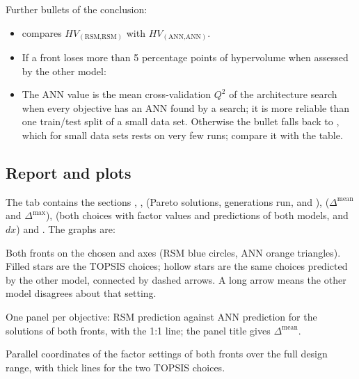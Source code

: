 Further bullets of the conclusion:
\begin{itemize}
  \item {}
        compares $HV_{(\text{RSM,RSM})}$ with $HV_{(\text{ANN,ANN})}$.
  \item If a front loses more than 5 percentage points of hypervolume when assessed by the other model:
  \item {} The ANN value is the mean
        cross-validation $Q^2$ of the architecture search when every objective has an ANN found by a search; it is
        more reliable than one train/test split of a small data set. Otherwise the bullet falls back to
        , which for small data sets rests on very few runs; compare it with the
         table.
\end{itemize}

\subsection{Report and plots}
The  tab contains the sections , ,  (Pareto solutions, generations run,  and
),  ($\Delta^\text{mean}$ and
$\Delta^\text{max}$),  (both choices with factor values and predictions of both
models, and $dx$) and . The graphs are:
\begin{description}[style=nextline]
  \item[\ui{ANN vs RSM: 2D front}] Both fronts on the chosen  and  axes (RSM blue circles, ANN orange
        triangles). Filled stars are the TOPSIS choices; hollow stars are the same choices predicted by the other
        model, connected by dashed arrows. A long arrow means the other model disagrees about that setting.
  \item[\ui{ANN vs RSM: cross-prediction}] One panel per objective: RSM prediction against ANN prediction for the
        solutions of both fronts, with the 1:1 line; the panel title gives $\Delta^\text{mean}$.
  \item[\ui{ANN vs RSM: factors}] Parallel coordinates of the factor settings of both fronts over the full design
        range, with thick lines for the two TOPSIS choices.
\end{description}


